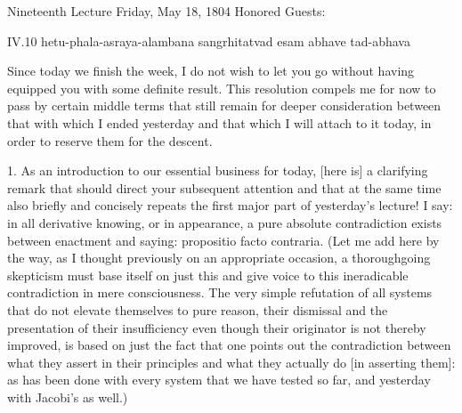 Nineteenth Lecture
Friday, May 18, 1804
Honored Guests:

IV.10
hetu-phala-asraya-alambana sangrhitatvad esam abhave tad-abhava

Since today we finish the week,
I do not wish to let you go without
having equipped you with some definite result.
This resolution compels me for now to pass by
certain middle terms that still remain
for deeper consideration between
that with which I ended yesterday
and that which I will attach to it today,
in order to reserve them for the descent.

1. As an introduction to our essential business for today,
[here is] a clarifying remark that
should direct your subsequent attention
and that at the same time also briefly and concisely
repeats the first major part of yesterday's lecture!
I say: in all derivative knowing, or in appearance,
a pure absolute contradiction exists
between enactment and saying:
propositio facto contraria.
(Let me add here by the way,
as I thought previously on an appropriate occasion,
a thoroughgoing skepticism must base itself on just this
and give voice to this ineradicable
contradiction in mere consciousness.
The very simple refutation of all systems
that do not elevate themselves to pure reason,
their dismissal and the presentation of their insufficiency
even though their originator is not thereby improved,
is based on just the fact that one points out
the contradiction between what they assert in their principles
and what they actually do [in asserting them]:
as has been done with every system that we have tested so far,
and yesterday with Jacobi's as well.)

